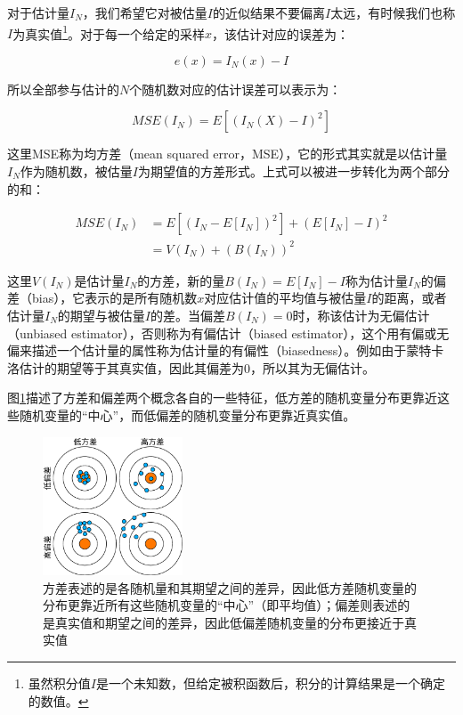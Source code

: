 对于估计量$I_N$，我们希望它对被估量$I$的近似结果不要偏离$I$太远，有时候我们也称$I$为真实值\footnote{虽然积分值$I$是一个未知数，但给定被积函数后，积分的计算结果是一个确定的数值。}。对于每一个给定的采样$x$，该估计对应的误差为：

\begin{equation}
	e(x)=I_N(x)-I
\end{equation}

所以全部参与估计的$N$个随机数对应的估计误差可以表示为：

\begin{equation}
	MSE(I_N)=E[(I_N(X)-I)^2]
\end{equation}


\noindent 这里MSE称为均方差（mean squared error，MSE），它的形式其实就是以估计量$I_N$作为随机数，被估量$I$为期望值的方差形式。上式可以被进一步转化为两个部分的和：

\begin{equation}
\begin{aligned}
	MSE(I_N)&=E[(I_N-E[I_N])^2]+(E[I_N]-I)^2 \\
	        &=V(I_N)+(B(I_N))^2
\end{aligned}
\end{equation}

这里$V(I_N)$是估计量$I_N$的方差，新的量$B(I_N)=E[I_N]-I$称为估计量$I_N$的偏差（bias），它表示的是所有随机数$x$对应估计值的平均值与被估量$I$的距离，或者估计量$I_N$的期望与被估量$I$的差。当偏差$B(I_N)=0$时，称该估计为无偏估计（unbiased estimator），否则称为有偏估计（biased estimator），这个用有偏或无偏来描述一个估计量的属性称为估计量的有偏性（biasedness）。例如由于蒙特卡洛估计的期望等于其真实值，因此其偏差为0，所以其为无偏估计。

图\ref{f:pt-bias-variance}描述了方差和偏差两个概念各自的一些特征，低方差的随机变量分布更靠近这些随机变量的“中心”，而低偏差的随机变量分布更靠近真实值。

\begin{figure}
	\sidecaption
	\includegraphics[width=0.37\textwidth]{figures/pt/bias-variance}
	\caption{方差表述的是各随机量和其期望之间的差异，因此低方差随机变量的分布更靠近所有这些随机变量的“中心”（即平均值）；偏差则表述的是真实值和期望之间的差异，因此低偏差随机变量的分布更接近于真实值}
	\label{f:pt-bias-variance}
\end{figure}

